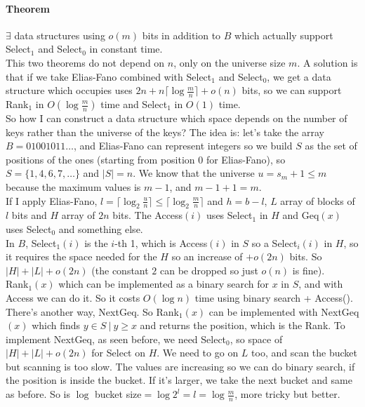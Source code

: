\documentclass[10pt]{report}
\begin{document}
\paragraph{Theorem} $\exists$ data structures using $o(m)$ bits in addition to $B$ which actually support Select$_1$ and Select$_0$ in constant time.\\
This two theorems do not depend on $n$, only on the universe size $m$. A solution is that if we take Elias-Fano combined with Select$_1$ and Select$_0$, we get a data structure which occupies uses $2n + n \lceil \log \frac{m}{n}\rceil+o(n)$ bits, so we can support Rank$_1$ in $O(\log\frac{m}{n})$ time and Select$_1$ in $O(1)$ time.\\
So how I can construct a data structure which space depends on the number of keys rather than the universe of the keys? The idea is: let's take the array $B = 01001011\ldots$, and Elias-Fano can represent integers so we build $S$ as the set of positions of the ones (starting from position $0$ for Elias-Fano), so $S=\{1,4,6,7,\ldots\}$ and $|S|=n$. We know that the universe $u = s_m + 1 \leq m$ because the maximum values is $m-1$, and $m-1+1=m$.\\
If I apply Elias-Fano, $l=\lceil\log_2\frac{u}{n}\rceil \leq \lceil\log_2\frac{m}{n}\rceil$ and $h = b - l$, $L$ array of blocks of $l$ bits and $H$ array of $2n$ bits. The Access$(i)$ uses Select$_1$ in $H$ and Geq$(x)$ uses Select$_0$ and something else.\\
In $B$, Select$_1(i)$ is the $i$-th 1, which is Access$(i)$ in $S$ so a Select$_i(i)$ in $H$, so it requires the space needed for the $H$ so an increase of $+o(2n)$ bits. So $|H|+|L| + o(2n)$ (the constant $2$ can be dropped so just $o(n)$ is fine).\\
Rank$_1(x)$ which can be implemented as a binary search for $x$ in $S$, and with Access we can do it. So it costs $O(\log n)$ time using binary search + Access(). There's another way, NextGeq. So Rank$_1(x)$ can be implemented with NextGeq$(x)$ which finds $y\in S\:|\:y\geq x$ and returns the position, which is the Rank. To implement NextGeq, as seen before, we need Select$_0$, so space of $|H|+|L|+o(2n)$ for Select on $H$. We need to go on $L$ too, and scan the bucket but scanning is too slow. The values are increasing so we can do binary search, if the position is inside the bucket. If it's larger, we take the next bucket and same as before. So is $\log$ bucket size$=\log 2^l = l = \log\frac{m}{n}$, more tricky but better.
\end{document}
